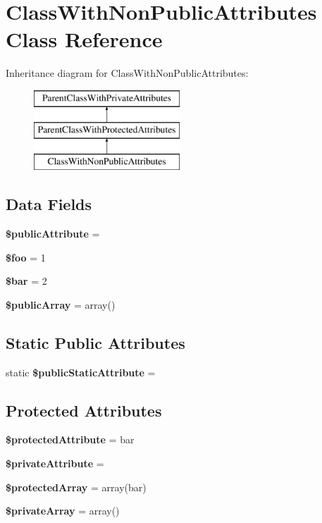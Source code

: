 \section{Class\+With\+Non\+Public\+Attributes Class Reference}
\label{class_class_with_non_public_attributes}
Inheritance diagram for Class\+With\+Non\+Public\+Attributes\+:\begin{figure}[H]
\begin{center}
\leavevmode
\includegraphics[height=3.000000cm]{class_class_with_non_public_attributes}
\end{center}
\end{figure}
\subsection*{Data Fields}
\begin{DoxyCompactItemize}
\item 
{\bf \$public\+Attribute} = \textquotesingle{}
\item 
{\bf \$foo} = 1
\item 
{\bf \$bar} = 2
\item 
{\bf \$public\+Array} = array(\textquotesingle{})
\end{DoxyCompactItemize}
\subsection*{Static Public Attributes}
\begin{DoxyCompactItemize}
\item 
static {\bf \$public\+Static\+Attribute} = \textquotesingle{}
\end{DoxyCompactItemize}
\subsection*{Protected Attributes}
\begin{DoxyCompactItemize}
\item 
{\bf \$protected\+Attribute} = \textquotesingle{}bar\textquotesingle{}
\item 
{\bf \$private\+Attribute} = \textquotesingle{}
\item 
{\bf \$protected\+Array} = array(\textquotesingle{}bar\textquotesingle{})
\item 
{\bf \$private\+Array} = array(\textquotesingle{})
\end{DoxyCompactItemize}
